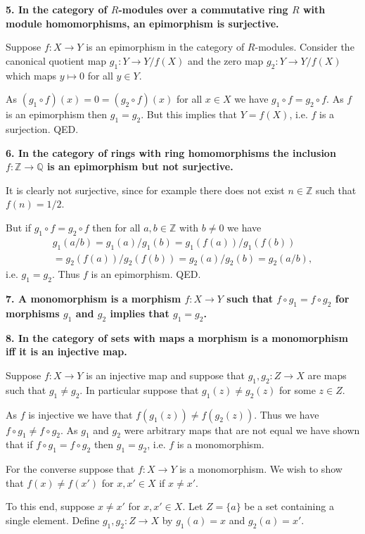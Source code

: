 \documentclass[12pt]{article}
\newcommand{\Z}{\mathbb{Z}}
\newcommand{\Q}{\mathbb{Q}}
\begin{document}
\textbf{5. In the category of $R$-modules over a commutative ring $R$ with module homomorphisms, an epimorphism is surjective.}

Suppose $f : X \to Y$ is an epimorphism in the category of $R$-modules. Consider the canonical quotient map $g_1 : Y \to Y/f(X)$ and the zero map $g_2 : Y \to Y/f(X)$ which maps $y \mapsto 0$ for all $y \in Y$.

As $(g_1\circ f)(x) = 0 = (g_2\circ f)(x)$ for all $x \in X$ we have $g_1\circ f = g_2\circ f$. As $f$ is an epimorphism then $g_1 = g_2$. But this implies that $Y = f(X)$, i.e. $f$ is a surjection. QED.

\textbf{6. In the category of rings with ring homomorphisms the inclusion $f : \Z \to \Q$ is an epimorphism but not surjective.}

It is clearly not surjective, since for example there does not exist $n \in \Z$ such that $f(n) = 1/2$.

But if $g_1\circ f = g_2\circ f$ then for all $a, b \in \Z$ with $b \neq 0$ we have 
\begin{multline*}g_1(a/b) = g_1(a)/g_1(b) = g_1(f(a))/g_1(f(b))\\
= g_2(f(a))/g_2(f(b)) = g_2(a)/g_2(b) = g_2(a/b),
\end{multline*}
i.e. $g_1 = g_2$. Thus $f$ is an epimorphism. QED.

\textbf{7. A monomorphism is a morphism $f : X \to Y$ such that $f\circ g_1 = f\circ g_2$ for morphisms $g_1$ and $g_2$ implies that $g_1 = g_2$.}

\textbf{8. In the category of sets with maps a morphism is a monomorphism iff it is an injective map.}

Suppose $f : X \to Y$ is an injective map and suppose that $g_1, g_2 : Z \to X$ are maps such that $g_1 \neq g_2$. In particular suppose that $g_1(z) \neq g_2(z)$ for some $z \in Z$.

As $f$ is injective we have that $f(g_1(z)) \neq f(g_2(z))$. Thus we have $f\circ g_1 \neq f\circ g_2$. As $g_1$ and $g_2$ were arbitrary maps that are not equal we have shown that if $f\circ g_1 = f\circ g_2$ then $g_1 = g_2$, i.e. $f$ is a monomorphism. 

For the converse suppose that $f : X \to Y$ is a monomorphism. We wish to show that $f(x) \neq f(x')$ for $x, x' \in X$ if $x \neq x'$.

To this end, suppose $x \neq x'$ for $x, x' \in X$. Let $Z = \{a\}$ be a set containing a single element. Define $g_1, g_2 : Z \to X$ by $g_1(a) = x$ and $g_2(a) = x'$.
\end{document}
